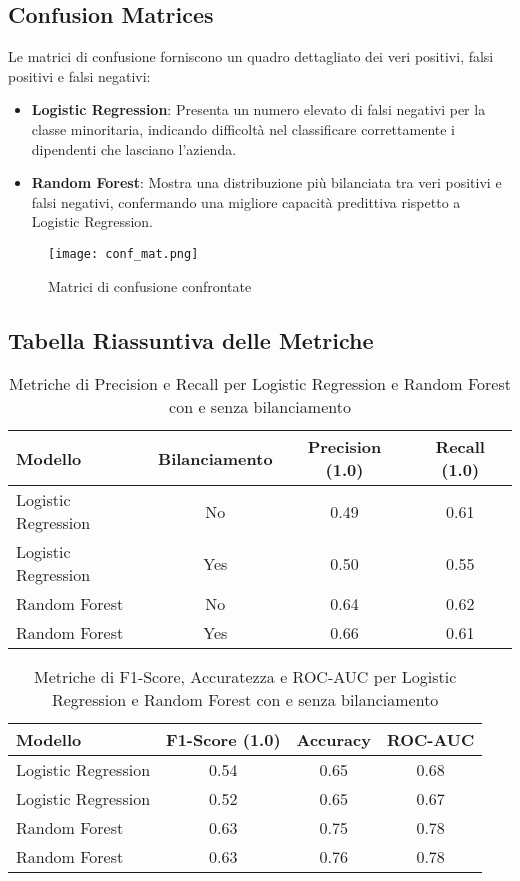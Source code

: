 \documentclass[a4paper,12pt]{article}
\begin{document}
\subsection{Confusion Matrices}
Le matrici di confusione forniscono un quadro dettagliato dei veri positivi, falsi positivi e falsi negativi:
\begin{itemize}
    \item \textbf{Logistic Regression}: Presenta un numero elevato di falsi negativi per la classe minoritaria, indicando difficoltà nel classificare correttamente i dipendenti che lasciano l'azienda.
    \item \textbf{Random Forest}: Mostra una distribuzione più bilanciata tra veri positivi e falsi negativi, confermando una migliore capacità predittiva rispetto a Logistic Regression.
\end{itemize}


\begin{figure}[H]
    \centering
    \texttt{[image: conf\_mat.png]}
    \caption{Matrici di confusione confrontate}
    \label{fig:confusion_rf}
\end{figure}

\subsection{Tabella Riassuntiva delle Metriche}

\begin{table}[H]
\centering
\begin{tabular}{lccc}
\toprule
\textbf{Modello} & \textbf{Bilanciamento} & \textbf{Precision (1.0)} & \textbf{Recall (1.0)} \\
\midrule
Logistic Regression & No  & 0.49 & 0.61 \\
Logistic Regression & Yes & 0.50 & 0.55 \\
Random Forest       & No  & 0.64 & 0.62 \\
Random Forest       & Yes & 0.66 & 0.61 \\
\bottomrule
\end{tabular}
\caption{Metriche di Precision e Recall per Logistic Regression e Random Forest con e senza bilanciamento}
\label{tab:metrics_summary_1}
\end{table}


\begin{table}[H]
\centering
\begin{tabular}{lccc}
\toprule
\textbf{Modello} & \textbf{F1-Score (1.0)} & \textbf{Accuracy} & \textbf{ROC-AUC} \\
\midrule
Logistic Regression & 0.54 & 0.65 & 0.68 \\
Logistic Regression & 0.52 & 0.65 & 0.67 \\
Random Forest       & 0.63 & 0.75 & 0.78 \\
Random Forest       & 0.63 & 0.76 & 0.78 \\
\bottomrule
\end{tabular}
\caption{Metriche di F1-Score, Accuratezza e ROC-AUC per Logistic Regression e Random Forest con e senza bilanciamento}
\label{tab:metrics_summary_2}
\end{table}
\end{document}
